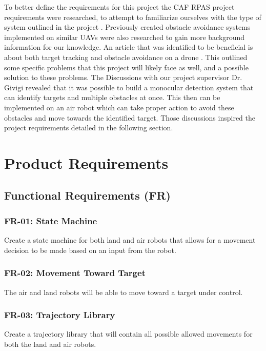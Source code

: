 \documentclass{article}
\begin{document}
	To better define the requirements for this project the CAF RPAS project requirements were researched, to attempt to familiarize ourselves with the type of system outlined in the project \cite{RPAS}. Previously created obstacle avoidance systems implemented on similar UAVs were also researched to gain more background information for our knowledge. An article that was identified to be beneficial is about both target tracking and obstacle avoidance on a drone \cite{woods2015dynamic}. This outlined some specific problems that this project will likely face as well, and a possible solution to these problems. 
	The Discussions with our project supervisor Dr. Givigi revealed that it was possible to build a monocular detection system that can identify targets and multiple obstacles at once. This then can be implemented on an air robot which can take proper action to avoid these obstacles and move towards the identified target. Those discussions inspired the project requirements detailed in the following section.

\section{Product Requirements}

	\subsection{Functional Requirements (FR)}
	
		\subsubsection{FR-01: State Machine}
		Create a state machine for both land and air robots that allows for a movement decision to be made based on an input from the robot. 
		
		\subsubsection{FR-02: Movement Toward Target}
		The air and land robots will be able to move toward a target under control.
		
		\subsubsection{FR-03: Trajectory Library}
		Create a trajectory library that will contain all possible allowed movements for both the land and air robots.
		
\end{document}
